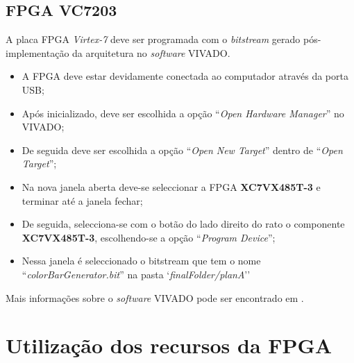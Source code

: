 \documentclass[11pt,a4paper]{article}
\begin{document}
	
	\subsection{FPGA VC7203}
	
	A placa FPGA \textit{Virtex-7} deve ser programada com o \textit{bitstream} gerado pós-implementação da arquitetura no \textit{software} VIVADO.
	\begin{itemize}
		\item A FPGA deve estar devidamente conectada ao computador através da porta USB;
		\item Após inicializado, deve ser escolhida a opção ``\textit{Open Hardware Manager}'' no VIVADO;
		\item De seguida deve ser escolhida a opção ``\textit{Open New Target}'' dentro de ``\textit{Open Target}'';
		\item Na nova janela aberta deve-se seleccionar a FPGA \textbf{XC7VX485T-3} e terminar até a janela fechar;
		\item De seguida, selecciona-se com o botão do lado direito do rato o componente \textbf{XC7VX485T-3}, escolhendo-se a opção ``\textit{Program Device}'';
		\item Nessa janela é seleccionado o bitstream que tem o nome ``\textit{colorBarGenerator.bit}'' na pasta `\textit{finalFolder/planA}''
	\end{itemize}
	
	Mais informações sobre o \textit{software} VIVADO pode ser encontrado em \cite{R019}.


	\section{Utilização dos recursos da FPGA}
	
\end{document}
